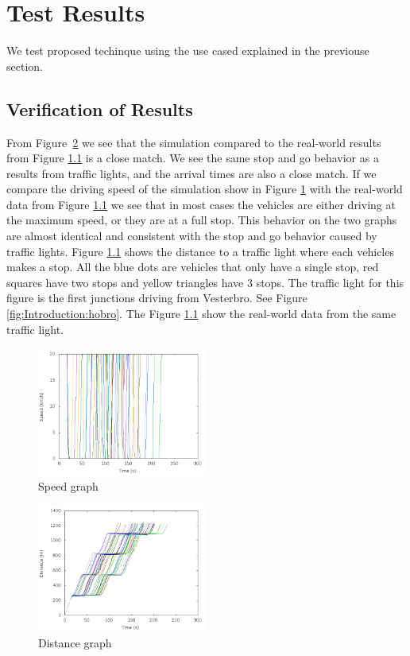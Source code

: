 \section{Test Results}
We test proposed techinque using the use cased explained in the previouse section.

\subsection{Verification of Results}

From Figure~\ref{fig:TestResults:distance0} we see that the simulation compared to the real-world results from Figure \ref{} is a close match. 
We see the same stop and go behavior as a results from traffic lights, and the arrival times are also a close match. 
If we compare the driving speed of the simulation show in Figure \ref{fig:TestResults:speed0} with the real-world data from Figure \ref{} we see that in most cases the vehicles are either driving at the maximum speed, or they are at a full stop. 
This behavior on the two graphs are almost identical and consistent with the stop and go behavior caused by traffic lights. 
Figure \ref{} shows the distance to a traffic light where each vehicles makes a stop. 
All the blue dots are vehicles that only have a single stop, red squares have two stops and yellow triangles have 3 stops.
The traffic light for this figure is the first junctions driving from Vesterbro. See Figure \ref{fig:Introduction:hobro}. The Figure \ref{} show the real-world data from the same traffic light. 

\begin{figure}[htb]
\includegraphics[width=0.5\textwidth]{images/speed0.png}
\caption{Speed graph}
\label{fig:TestResults:speed0}
\end{figure}

\begin{figure}[htb]
\includegraphics[width=0.5\textwidth]{images/distance0.png}
\caption{Distance graph}
\label{fig:TestResults:distance0}
\end{figure}

